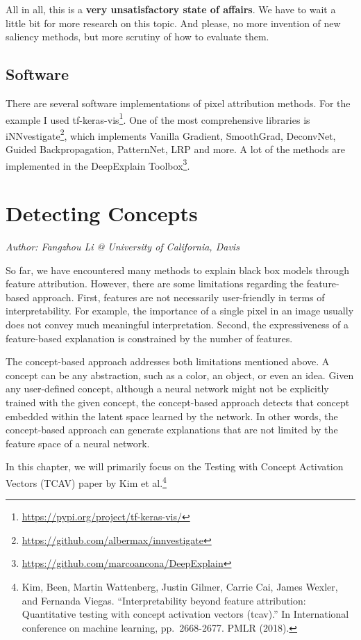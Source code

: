 \documentclass[
  10pt,
]{scrbook}
\renewcommand{\href}[2]{#2\footnote{\url{#1}}}
\begin{document}
All in all, this is a \textbf{very unsatisfactory state of affairs}.
We have to wait a little bit for more research on this topic.
And please, no more invention of new saliency methods, but more scrutiny of how to evaluate them.

\hypertarget{software-6}{%
\subsection{Software}\label{software-6}}

There are several software implementations of pixel attribution methods.
For the example I used \href{https://pypi.org/project/tf-keras-vis/}{tf-keras-vis}.
One of the most comprehensive libraries is \href{https://github.com/albermax/innvestigate}{iNNvestigate}, which implements Vanilla Gradient, SmoothGrad, DeconvNet, Guided Backpropagation, PatternNet, LRP and more.
A lot of the methods are implemented in the \href{https://github.com/marcoancona/DeepExplain}{DeepExplain Toolbox}.

\newpage

\hypertarget{detecting-concepts}{%
\section{Detecting Concepts}\label{detecting-concepts}}

\emph{Author: Fangzhou Li @ University of California, Davis}

So far, we have encountered many methods to explain black box models through feature attribution.
However, there are some limitations regarding the feature-based approach.
First, features are not necessarily user-friendly in terms of interpretability.
For example, the importance of a single pixel in an image usually does not convey much meaningful interpretation.
Second, the expressiveness of a feature-based explanation is constrained by the number of features.

The concept-based approach addresses both limitations mentioned above.
A concept can be any abstraction, such as a color, an object, or even an idea.
Given any user-defined concept, although a neural network might not be explicitly trained with the given concept, the concept-based approach detects that concept embedded within the latent space learned by the network.
In other words, the concept-based approach can generate explanations that are not limited by the feature space of a neural network.

In this chapter, we will primarily focus on the Testing with Concept Activation Vectors (TCAV) paper by Kim et al.\footnote{Kim, Been, Martin Wattenberg, Justin Gilmer, Carrie Cai, James Wexler, and Fernanda Viegas. ``Interpretability beyond feature attribution: Quantitative testing with concept activation vectors (tcav).'' In International conference on machine learning, pp.~2668-2677. PMLR (2018).}
\end{document}
